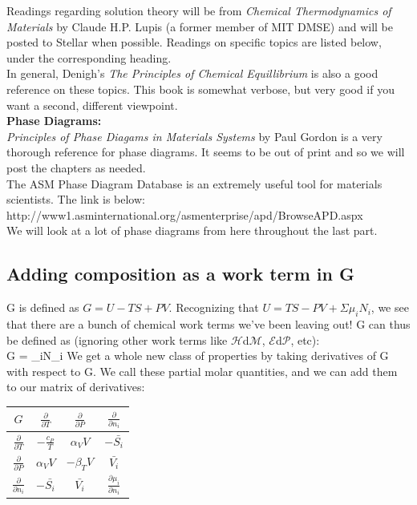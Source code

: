 \documentclass[12pt]{article}
\begin{document}
Readings regarding solution theory will be from \textit{ Chemical Thermodynamics of Materials} by Claude H.P. Lupis (a former member of MIT DMSE) and will be posted to Stellar when possible. Readings on specific topics are listed below, under the corresponding heading.\\
In general, Denigh{'}s \textit{ The Principles of Chemical Equillibrium} is also a good reference on these topics. This book is somewhat verbose, but very good if you want a second, different viewpoint.\\
\textbf{Phase Diagrams:}\\
\textit{ Principles of Phase Diagams in Materials Systems} by Paul Gordon is a very thorough reference for phase diagrams. It seems to be out of print and so we will post the chapters as needed.\\
The ASM Phase Diagram Database is an extremely useful tool for materials scientists. The link is below:\\
http://www1.asminternational.org/asmenterprise/apd/BrowseAPD.aspx\\
We will look at a lot of phase diagrams from here throughout the last part.

\subsection{Adding composition as a work term in G}
G is defined as $G = U-TS+PV$. Recognizing that $U = TS - PV + \Sigma \mu _iN_i$, we see that there are a bunch of chemical work terms we{'}ve been
leaving out! G can thus be defined as (ignoring other work terms like $\mathcal{H}$d$\mathcal{M}$, $\mathcal{E}$d$\mathcal{P}$, etc):\\
\eqs G = \Sigma \mu _iN_i\eqe
We get a whole new class of properties by taking derivatives of G with respect to G. We call these partial molar quantities, and we can add them to our matrix of derivatives:
\begin{center}
\begin{tabular}{c | c | c | c}
 $G$ & $\frac{\partial}{\partial T}$ & $\frac{\partial}{\partial P}$ & $\frac{\partial}{\partial n_i}$\\ \hline
 $\frac{\partial}{\partial T}$ & $-\frac{c_P}{T}$ & $\alpha_V V$ & $-\bar{S_i}$\\ \hline
 $\frac{\partial}{\partial P}$ & $\alpha_V V$ & $-\beta_T V$ & $\bar{V_i}$\\ \hline
 $\frac{\partial}{\partial n_i}$ & $-\bar{S_i}$ & $\bar{V_i}$ & $\frac{\partial \mu_i}{\partial n_i}$
\end{tabular}
\end{center}
\end{document}
